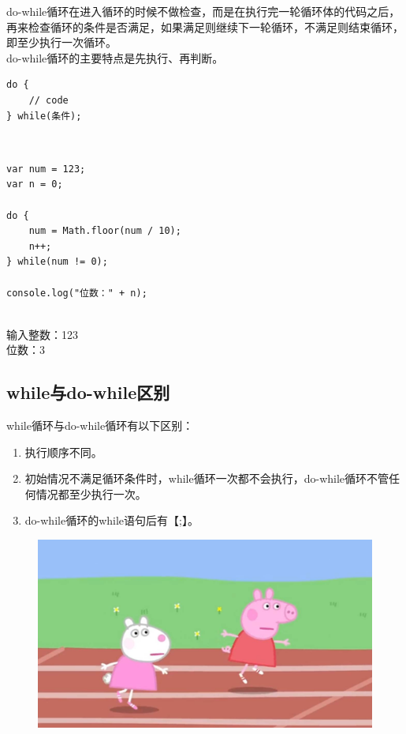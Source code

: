 do-while循环在进入循环的时候不做检查，而是在执行完一轮循环体的代码之后，再来检查循环的条件是否满足，如果满足则继续下一轮循环，不满足则结束循环，即至少执行一次循环。 \\

do-while循环的主要特点是先执行、再判断。 \\

\begin{lstlisting}[style=htmlcssjs]
do {
    // code
} while(条件);
\end{lstlisting}

 \\

\begin{lstlisting}[style=htmlcssjs]
var num = 123;
var n = 0;

do {
    num = Math.floor(num / 10);
    n++;
} while(num != 0);

console.log("位数：" + n);
\end{lstlisting}

\begin{tcolorbox}
	 \\
	输入整数：123 \\
	位数：3
\end{tcolorbox}

\subsection{while与do-while区别}

while循环与do-while循环有以下区别：

\begin{enumerate}
	\item 执行顺序不同。

	\item 初始情况不满足循环条件时，while循环一次都不会执行，do-while循环不管任何情况都至少执行一次。

	\item do-while循环的while语句后有【;】。
\end{enumerate}

\begin{figure}[H]
	\centering
	\includegraphics[scale=0.2]{img/C11/11-3/1.png}
\end{figure}

